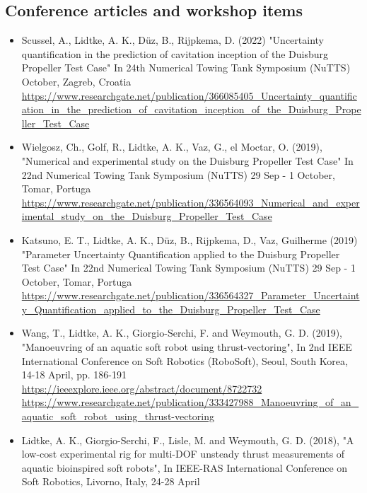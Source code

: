 \documentclass[a4paper,10pt]{article}
\begin{document}
\subsection{Conference articles and workshop items}
%
\begin{itemize}
%
\item Scussel, A., Lidtke, A. K., D{\"u}z, B., Rijpkema, D. (2022)
	"Uncertainty quantification in the prediction of cavitation inception of the Duisburg Propeller Test Case"
	In 24th Numerical Towing Tank Symposium (NuTTS)
	October, Zagreb, Croatia
	\cite{scussel_uncertainty_2022}
	\\ \url{https://www.researchgate.net/publication/366085405_Uncertainty_quantification_in_the_prediction_of_cavitation_inception_of_the_Duisburg_Propeller_Test_Case}
%
\item Wielgosz, Ch., Golf, R., Lidtke, A. K., Vaz, G., el Moctar, O. (2019),
	"Numerical and experimental study on the Duisburg Propeller Test Case"
	In 22nd Numerical Towing Tank Symposium (NuTTS)
	29 Sep - 1 October, Tomar, Portuga
	\cite{Wielgosz2019}
	\\ \url{https://www.researchgate.net/publication/336564093_Numerical_and_experimental_study_on_the_Duisburg_Propeller_Test_Case}
%
\item Katsuno, E. T., Lidtke, A. K., D{\"u}z, B., Rijpkema, D., Vaz, Guilherme (2019)
	"Parameter Uncertainty Quantification applied to the Duisburg Propeller Test Case"
	In 22nd Numerical Towing Tank Symposium (NuTTS)
	29 Sep - 1 October, Tomar, Portuga
	\cite{Katsuno2019}
	\\ \url{https://www.researchgate.net/publication/336564327_Parameter_Uncertainty_Quantification_applied_to_the_Duisburg_Propeller_Test_Case}
%
\item Wang, T., Lidtke, A. K., Giorgio-Serchi, F. and Weymouth, G. D. (2019),
	"Manoeuvring of an aquatic soft robot using thrust-vectoring",
	In 2nd IEEE International Conference on Soft Robotics (RoboSoft),
	Seoul, South Korea, 14-18 April, pp. 186-191
	\cite{Wang2019}
	\\ \url{https://ieeexplore.ieee.org/abstract/document/8722732}
	\\ \url{https://www.researchgate.net/publication/333427988\_Manoeuvring\_of\_an\_aquatic\_soft\_robot\_using\_thrust-vectoring}
%
\item Lidtke, A. K., Giorgio-Serchi, F., Lisle, M. and Weymouth, G. D. (2018),
	"A low-cost experimental rig for multi-DOF unsteady thrust measurements of aquatic bioinspired soft robots",
	In IEEE-RAS International Conference on Soft Robotics, Livorno, Italy, 24-28 April

\end{itemize}
\end{document}
